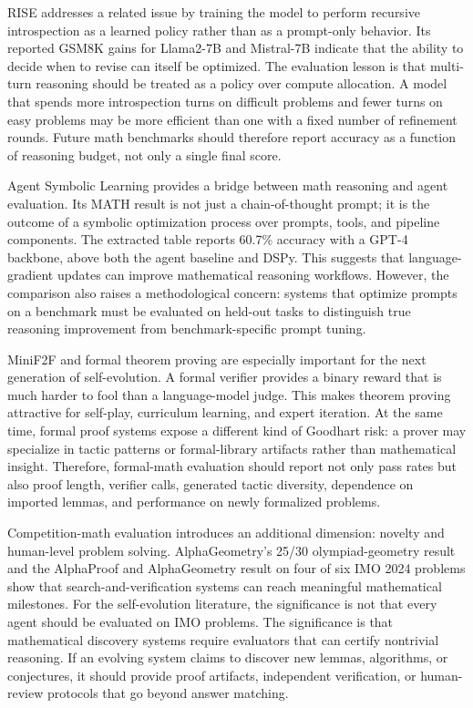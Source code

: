 RISE addresses a related issue by training the model to perform recursive introspection as a learned policy rather than as a prompt-only behavior. Its reported GSM8K gains for Llama2-7B and Mistral-7B indicate that the ability to decide when to revise can itself be optimized. The evaluation lesson is that multi-turn reasoning should be treated as a policy over compute allocation. A model that spends more introspection turns on difficult problems and fewer turns on easy problems may be more efficient than one with a fixed number of refinement rounds. Future math benchmarks should therefore report accuracy as a function of reasoning budget, not only a single final score.

Agent Symbolic Learning provides a bridge between math reasoning and agent evaluation. Its MATH result is not just a chain-of-thought prompt; it is the outcome of a symbolic optimization process over prompts, tools, and pipeline components. The extracted table reports 60.7\% accuracy with a GPT-4 backbone, above both the agent baseline and DSPy. This suggests that language-gradient updates can improve mathematical reasoning workflows. However, the comparison also raises a methodological concern: systems that optimize prompts on a benchmark must be evaluated on held-out tasks to distinguish true reasoning improvement from benchmark-specific prompt tuning.

MiniF2F and formal theorem proving are especially important for the next generation of self-evolution. A formal verifier provides a binary reward that is much harder to fool than a language-model judge. This makes theorem proving attractive for self-play, curriculum learning, and expert iteration. At the same time, formal proof systems expose a different kind of Goodhart risk: a prover may specialize in tactic patterns or formal-library artifacts rather than mathematical insight. Therefore, formal-math evaluation should report not only pass rates but also proof length, verifier calls, generated tactic diversity, dependence on imported lemmas, and performance on newly formalized problems.

Competition-math evaluation introduces an additional dimension: novelty and human-level problem solving. AlphaGeometry's 25/30 olympiad-geometry result and the AlphaProof and AlphaGeometry result on four of six IMO 2024 problems show that search-and-verification systems can reach meaningful mathematical milestones. For the self-evolution literature, the significance is not that every agent should be evaluated on IMO problems. The significance is that mathematical discovery systems require evaluators that can certify nontrivial reasoning. If an evolving system claims to discover new lemmas, algorithms, or conjectures, it should provide proof artifacts, independent verification, or human-review protocols that go beyond answer matching.

